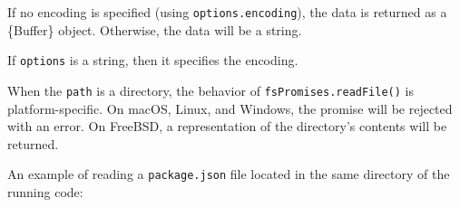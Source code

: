 If no encoding is specified (using \texttt{options.encoding}), the data
is returned as a \{Buffer\} object. Otherwise, the data will be a
string.

If \texttt{options} is a string, then it specifies the encoding.

When the \texttt{path} is a directory, the behavior of
\texttt{fsPromises.readFile()} is platform-specific. On macOS, Linux,
and Windows, the promise will be rejected with an error. On FreeBSD, a
representation of the directory's contents will be returned.

An example of reading a \texttt{package.json} file located in the same
directory of the running code:

\begin{Shaded}
\begin{Highlighting}[]
 \OperatorTok{;}
\NormalTok{ \{}
  \OperatorTok{=}  \NormalTok{(}\OperatorTok{,} \NormalTok{)}\OperatorTok{;}
  \OperatorTok{=}  \OperatorTok{,}\NormalTok{ \{ }\OperatorTok{:} \NormalTok{ \})}\OperatorTok{;}
  \OperatorTok{;}
\NormalTok{\} }
  \NormalTok{)}\OperatorTok{;}
\NormalTok{\}}
\end{Highlighting}
\end{Shaded}

